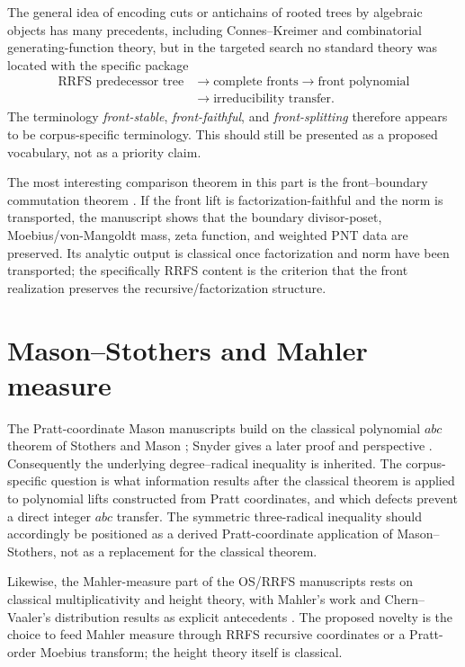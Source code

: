 \documentclass[11pt]{article}
\begin{document}
The general idea of encoding cuts or antichains of rooted trees by algebraic objects has many precedents, including Connes--Kreimer and combinatorial generating-function theory, but in the targeted search no standard theory was located with the specific package
\[
\begin{aligned}
 \text{RRFS predecessor tree}&\longrightarrow\text{complete fronts}\longrightarrow\text{front polynomial}\\
 &\longrightarrow\text{irreducibility transfer}.
\end{aligned}
\]
The terminology \emph{front-stable}, \emph{front-faithful}, and \emph{front-splitting} therefore appears to be corpus-specific terminology. This should still be presented as a proposed vocabulary, not as a priority claim.

The most interesting comparison theorem in this part is the front--boundary commutation theorem \cite{LekaCommute}. If the front lift is factorization-faithful and the norm is transported, the manuscript shows that the boundary divisor-poset, Moebius/von-Mangoldt mass, zeta function, and weighted PNT data are preserved. Its analytic output is classical once factorization and norm have been transported; the specifically RRFS content is the criterion that the front realization preserves the recursive/factorization structure.

\section{Mason--Stothers and Mahler measure}
The Pratt-coordinate Mason manuscripts build on the classical polynomial $abc$ theorem of Stothers and Mason \cite{Stothers1981,Mason1984}; Snyder gives a later proof and perspective \cite{Snyder2000}. Consequently the underlying degree--radical inequality is inherited. The corpus-specific question is what information results after the classical theorem is applied to polynomial lifts constructed from Pratt coordinates, and which defects prevent a direct integer $abc$ transfer. The symmetric three-radical inequality \cite{LekaMason} should accordingly be positioned as a derived Pratt-coordinate application of Mason--Stothers, not as a replacement for the classical theorem.

Likewise, the Mahler-measure part of the OS/RRFS manuscripts rests on classical multiplicativity and height theory, with Mahler's work and Chern--Vaaler's distribution results as explicit antecedents \cite{Mahler1962,ChernVaaler2001}. The proposed novelty is the choice to feed Mahler measure through RRFS recursive coordinates or a Pratt-order Moebius transform; the height theory itself is classical.
\end{document}
